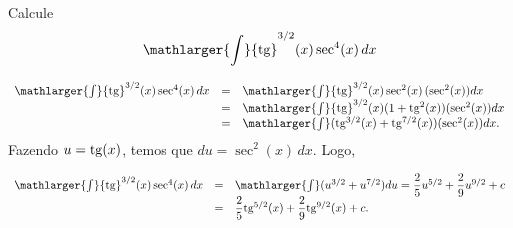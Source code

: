 \cleardoublepage\documentclass[../main.tex]{subfiles}
\begin{document}
\begin{ex}
Calcule 
\[ \mathlarger{\int} {\rm tg}^{3/2}( x) \sec^{4}(x)\, dx\]

\begin{solution}
\[ \begin{array}{rcl} \mathlarger{\int} {\rm tg}^{3/2}( x) \sec^{4}(x)\, dx &=& \mathlarger{\int} {\rm tg}^{3/2}( x) \sec^2 (x)\,(\sec^2(x)) dx\\ &=& \mathlarger{\int} {\rm tg}^{3/2} (x) (1+{\rm tg}^2 (x))(\sec^2(x) )dx\\ &=& \mathlarger{\int} ({\rm tg}^{3/2} (x) + {\rm tg}^{7/2}( x) )(\sec^2(x)) dx. \end{array} \]
Fazendo \( u={\rm tg}(x)\), temos que \( du=\sec^2(x)\,dx \). Logo,

\[ \begin{array}{rcl} \mathlarger{\int} {\rm tg}^{3/2}( x) \sec^{4}(x)\, dx &=& \mathlarger{\int} (u^{3/2} + u^{7/2} )du= \dfrac{2}{5} u^{5/2} + \dfrac{2}{9} u^{9/2} +c\\ &=&\dfrac{2}{5} {\rm tg}^{5/2}( x) + \dfrac{2}{9} {\rm tg}^{9/2} (x) +c. \end{array} \]
\end{solution}
\end{ex}
\end{document}

